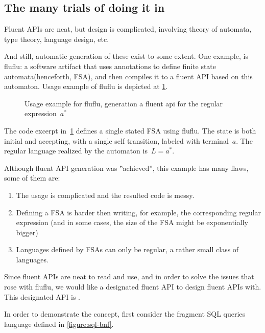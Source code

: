 \subsection{The many trials of doing it in \Java}
Fluent APIs are neat, but design is complicated,
involving theory of automata, type theory, language design, etc.

And still, automatic generation of these exist to some extent.
One example, is fluflu: a software artifact that uses
\Java annotations to define finite state automata(henceforth, FSA), and then
compiles it to a fluent API based on this automaton. Usage example of fluflu is
depicted at \cref{figure:fluflu}.

\begin{figure}[ht]
  \caption{\label{figure:fluflu}
    Usage example for fluflu, generation a fluent
    api for the regular expression~$a^*$}
\end{figure}
The code excerpt in~\cref{figure:fluflu} defines a single stated FSA using
fluflu. The state is both initial and accepting, with a single self
transition, labeled with terminal~$a$. The regular language realized by the
automaton is~$L=a^*$.

Although fluent API generation was ‟achieved”, this example has many flaws, some of them are:

\begin{enumerate}
  \item The usage is complicated and the resulted code is messy.
  \item Defining a FSA is harder then writing, for example, the corresponding regular
    expression (and in some cases, the size of the FSA might be exponentially bigger)
  \item Languages defined by FSAs can only be regular, a rather small
    class of languages.
\end{enumerate}

Since fluent APIs are neat to read and use,
  and in order to solve the issues that rose with fluflu,
  we would like a designated fluent API to design fluent APIs with.
This designated API is \Fajita.

In order to demonstrate the concept, first consider the fragment SQL queries
language defined in \cref{figure:sql-bnf}.

